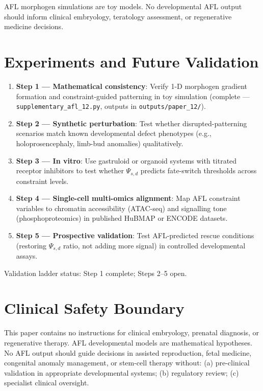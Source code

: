 \documentclass[11pt]{article}
\begin{document}
AFL morphogen simulations are toy models. No developmental AFL output should inform clinical embryology, teratology assessment, or regenerative medicine decisions.

\section{Experiments and Future Validation}

\begin{enumerate}
  \item \textbf{Step 1 --- Mathematical consistency}: Verify 1-D morphogen gradient formation and constraint-guided patterning in toy simulation (complete --- \texttt{supplementary\_afl\_12.py}, outputs in \texttt{outputs/paper\_12/}).
  \item \textbf{Step 2 --- Synthetic perturbation}: Test whether disrupted-patterning scenarios match known developmental defect phenotypes (e.g., holoprosencephaly, limb-bud anomalies) qualitatively.
  \item \textbf{Step 3 --- In vitro}: Use gastruloid or organoid systems with titrated receptor inhibitors to test whether $\Psi_{s,d}$ predicts fate-switch thresholds across constraint levels.
  \item \textbf{Step 4 --- Single-cell multi-omics alignment}: Map AFL constraint variables to chromatin accessibility (ATAC-seq) and signalling tone (phosphoproteomics) in published HuBMAP or ENCODE datasets.
  \item \textbf{Step 5 --- Prospective validation}: Test AFL-predicted rescue conditions (restoring $\Psi_{s,d}$ ratio, not adding more signal) in controlled developmental assays.
\end{enumerate}

Validation ladder status: Step 1 complete; Steps 2--5 open.

\section{Clinical Safety Boundary}

This paper contains no instructions for clinical embryology, prenatal diagnosis, or regenerative therapy. AFL developmental models are mathematical hypotheses. No AFL output should guide decisions in assisted reproduction, fetal medicine, congenital anomaly management, or stem-cell therapy without: (a) pre-clinical validation in appropriate developmental systems; (b) regulatory review; (c) specialist clinical oversight.
\end{document}
